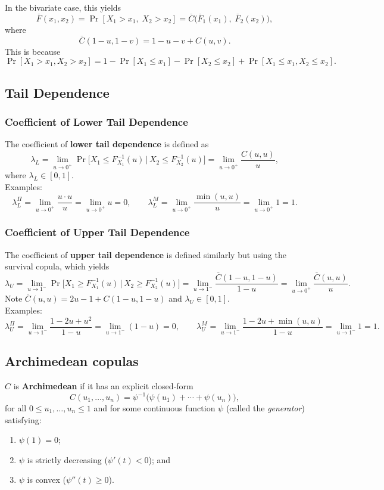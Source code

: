 \documentclass[11pt]{article}
\newcommand{\noi}{\noindent}
\begin{document}
\noi In the bivariate case, this yields
\[
\overline{F}(x_1,x_2)
=\Pr[X_1>x_1,\;X_2>x_2]
=\overline{C}\bigl(\overline{F}_1(x_1),\;\overline{F}_2(x_2)\bigr),
\]
where
\[
\overline{C}(1-u,1-v)=1-u-v+C(u,v).
\]
This is because
\[
\Pr[X_1>x_1,X_2>x_2]
=1-\Pr[X_1\le x_1]-\Pr[X_2\le x_2]
+\Pr[X_1\le x_1,X_2\le x_2].
\]

\subsection{Tail Dependence}
\subsubsection{Coefficient of Lower Tail Dependence}
\noi The coefficient of \textbf{lower tail dependence} is defined as
\[
\lambda_L
=\lim_{u\to0^+}
\Pr\bigl[X_1 \le F_{X_1}^{-1}(u)\,\big|\,X_2 \le F_{X_2}^{-1}(u)\bigr]
=\lim_{u\to0^+}\frac{C(u,u)}{u},
\]
\noi where $\lambda_L\in[0,1]$.\\

\noi Examples:
\[
\lambda_L^{\Pi}
=\lim_{u\to0^+}\frac{u\cdot u}{u}
=\lim_{u\to0^+}u=0,
\qquad
\lambda_L^{M}
=\lim_{u\to0^+}\frac{\min(u,u)}{u}
=\lim_{u\to0^+}1=1.
\]

\subsubsection{Coefficient of Upper Tail Dependence}
\noi The coefficient of \textbf{upper tail dependence} is defined similarly but using the survival copula, which yields
\[
\lambda_U
=\lim_{u\to1^-}
\Pr\bigl[X_1\ge F_{X_1}^{-1}(u)\,\big|\,X_2\ge F_{X_2}^{-1}(u)\bigr]
=\lim_{u\to1^-}\frac{\overline{C}(1-u,1-u)}{1-u}
=\lim_{u\to0^+}\frac{\overline{C}(u,u)}{u}.
\]
\noi Note $\overline{C}(u,u)=2u-1+C(1-u,1-u)$ and $\lambda_U\in[0,1]$.\\
\noi Examples:
\[
\lambda_U^{\Pi}
=\lim_{u\to1^-}\frac{1-2u+u^2}{1-u}
=\lim_{u\to1^-}(1-u)=0,
\qquad
\lambda_U^{M}
=\lim_{u\to1^-}\frac{1-2u+\min(u,u)}{1-u}
=\lim_{u\to1^-}1=1.
\]

\subsection{Archimedean copulas}
\noi $C$ is \textbf{Archimedean} if it has an explicit closed‐form
\[
C(u_1,\dots,u_n)
=\psi^{-1}\bigl(\psi(u_1)+\cdots+\psi(u_n)\bigr),
\]
for all $0\le u_1,\dots,u_n\le1$ and for some continuous function $\psi$ (called the \emph{generator}) satisfying:
\begin{enumerate}
    \item $\psi(1)=0$;
    \item $\psi$ is strictly decreasing ($\psi'(t) < 0$); and
    \item $\psi$ is convex ($\psi''(t) \geq 0$).
\end{enumerate} \phantom{i}
\end{document}
